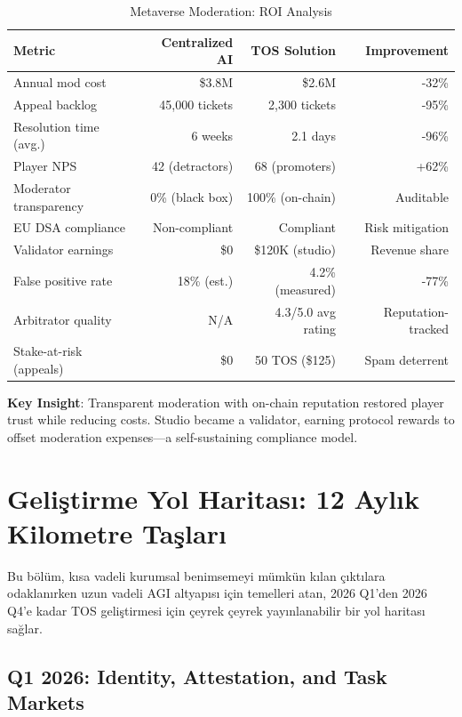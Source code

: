 \documentclass[11pt]{article}
\begin{document}
\begin{itemize}[noitemsep]
\begin{itemize}[noitemsep]
\begin{itemize}[noitemsep]
\begin{itemize}[noitemsep]
\begin{itemize}[noitemsep]
\begin{itemize}[noitemsep]
\begin{itemize}[noitemsep]
\begin{enumerate}[noitemsep]
\begin{itemize}[noitemsep]
\begin{table}[H]
\centering
\caption{Metaverse Moderation: ROI Analysis}
\label{tab:metaverse-roi}
\begin{tabular}{@{}lrrr@{}}
\toprule
\textbf{Metric} & \textbf{Centralized AI} & \textbf{TOS Solution} & \textbf{Improvement} \\ \midrule
Annual mod cost & \$3.8M & \$2.6M & -32\% \\
Appeal backlog & 45,000 tickets & 2,300 tickets & -95\% \\
Resolution time (avg.) & 6 weeks & 2.1 days & -96\% \\
Player NPS & 42 (detractors) & 68 (promoters) & +62\% \\
Moderator transparency & 0\% (black box) & 100\% (on-chain) & Auditable \\
EU DSA compliance & Non-compliant & Compliant & Risk mitigation \\
Validator earnings & \$0 & \$120K (studio) & Revenue share \\
False positive rate & 18\% (est.) & 4.2\% (measured) & -77\% \\
Arbitrator quality & N/A & 4.3/5.0 avg rating & Reputation-tracked \\
Stake-at-risk (appeals) & \$0 & 50 TOS (\$125) & Spam deterrent \\
\bottomrule
\end{tabular}
\end{table}

\textbf{Key Insight}: Transparent moderation with on-chain reputation restored player trust while reducing costs. Studio became a validator, earning protocol rewards to offset moderation expenses—a self-sustaining compliance model.

\section{Geliştirme Yol Haritası: 12 Aylık Kilometre Taşları}
\label{sec:12month-roadmap}

Bu bölüm, kısa vadeli kurumsal benimsemeyi mümkün kılan çıktılara odaklanırken uzun vadeli AGI altyapısı için temelleri atan, 2026 Q1'den 2026 Q4'e kadar TOS geliştirmesi için çeyrek çeyrek yayınlanabilir bir yol haritası sağlar.

\subsection{Q1 2026: Identity, Attestation, and Task Markets}


\end{itemize}
\end{enumerate}
\end{itemize}
\end{itemize}
\end{itemize}
\end{itemize}
\end{itemize}
\end{itemize}
\end{itemize}
\end{document}
